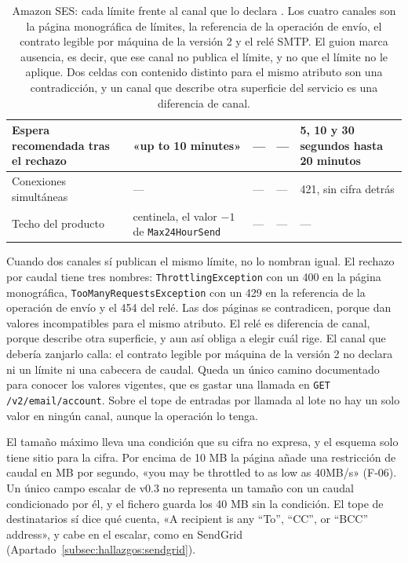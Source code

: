 \begin{table}[H]
\begin{tabular}{|p{}|p{}|p{}|p{}|p{}|}
\hline
\raggedright Espera recomendada tras el rechazo & \raggedright «up to 10 minutes» & \raggedright --- & \raggedright --- & \raggedright 5, 10 y 30 segundos hasta 20 minutos \tabularnewline
\hline
\raggedright Conexiones simultáneas & \raggedright --- & \raggedright --- & \raggedright --- & \raggedright 421, sin cifra detrás \tabularnewline
\hline
\raggedright Techo del producto & \raggedright centinela, el valor $-1$ de \texttt{Max24HourSend} & \raggedright --- & \raggedright --- & \raggedright --- \tabularnewline
\hline
\end{tabular}
\caption{Amazon SES: cada límite frente al canal que lo declara \citep{sesdocs}. Los
cuatro canales son la página monográfica de límites, la referencia de la operación de
envío, el contrato legible por máquina de la versión 2 y el relé SMTP. El guion marca
ausencia, es decir, que ese canal no publica el límite, y no que el límite no le aplique.
Dos celdas con contenido distinto para el mismo atributo son una contradicción, y un
canal que describe otra superficie del servicio es una diferencia de canal.}
\label{tab:hallazgos:ses:canales}
\end{table}

Cuando dos canales sí publican el mismo límite, no lo nombran igual. El
rechazo por caudal tiene tres nombres:
\texttt{Throttling\allowbreak Exception} con un 400 en la página monográfica,
\texttt{TooMany\allowbreak RequestsException} con un 429 en la referencia de la
operación de envío y el 454 del relé. Las dos páginas se contradicen, porque
dan valores incompatibles para el mismo atributo. El relé es diferencia de
canal, porque describe otra superficie, y aun así obliga a elegir cuál rige.
El canal que debería
zanjarlo calla: el contrato legible por máquina de la versión 2 no declara ni
un límite ni una cabecera de caudal. Queda un único camino documentado para
conocer los valores vigentes, que es gastar una llamada en
\texttt{GET /v2/email/\allowbreak account}. Sobre el tope de entradas por
llamada al lote no hay un solo valor en ningún canal, aunque la operación lo
tenga.

El tamaño máximo lleva una condición que su cifra no expresa, y el esquema
solo tiene sitio para la cifra. Por encima de 10 MB la página añade una
restricción de caudal en MB por segundo, «you may be throttled to as low as
40MB/s» (F-06). Un único campo escalar de v0.3 no representa un tamaño con un
caudal condicionado por él, y el fichero guarda los 40 MB sin la condición. El
tope de destinatarios sí dice qué cuenta, «A recipient is any ``To'', ``CC'',
or ``BCC'' address», y cabe en el escalar, como en SendGrid
(Apartado~\ref{subsec:hallazgos:sendgrid}).

